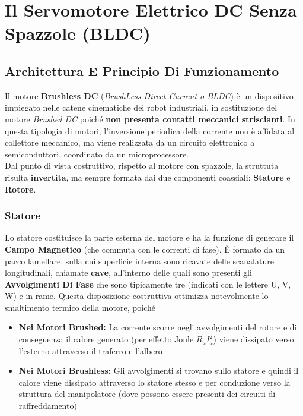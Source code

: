 ﻿\documentclass[11pt, a4paper]{article}
\begin{document}
\newpage



\newpage

\section{Il Servomotore Elettrico DC Senza Spazzole (BLDC)}

\subsection{Architettura E Principio Di Funzionamento}
Il motore \textbf{Brushless DC} (\textit{BrushLess Direct Current o BLDC}) è un dispositivo impiegato nelle catene cinematiche dei robot industriali, in sostituzione del motore \textit{Brushed DC} poiché \textbf{non presenta contatti meccanici striscianti}. In questa tipologia di motori, l'inversione periodica della corrente non è affidata al collettore meccanico, ma viene realizzata da un circuito elettronico a semiconduttori, coordinato da un microprocessore.\\
Dal punto di vista costruttivo, rispetto al motore con spazzole, la struttuta risulta \textbf{invertita}, ma sempre formata dai due componenti coassiali: \textbf{Statore} e \textbf{Rotore}.

\subsubsection{Statore}
Lo statore costituisce la parte esterna del motore e ha la funzione di generare il \textbf{Campo Magnetico} (che commuta con le correnti di fase). È formato da un pacco lamellare, sulla cui superficie interna sono ricavate delle scanalature longitudinali, chiamate \textbf{cave}, all'interno delle quali sono presenti gli \textbf{Avvolgimenti Di Fase} che sono tipicamente tre (indicati con le lettere U, V, W) e in rame. Questa disposizione costruttiva ottimizza notevolmente lo smaltimento termico della motore, poiché
\begin{itemize}
    \item \textbf{Nei Motori Brushed:} La corrente scorre negli avvolgimenti del rotore e di conseguenza il calore generato (per effetto Joule $R_a I_a^2$) viene dissipato verso l'esterno attraverso il traferro e l'albero
    \item \textbf{Nei Motori Brushless:} Gli avvolgimenti si trovano sullo statore e quindi il calore viene dissipato attraverso lo statore stesso e per conduzione verso la struttura del manipolatore (dove possono essere presenti dei circuiti di raffreddamento)
\end{itemize}
\end{document}

